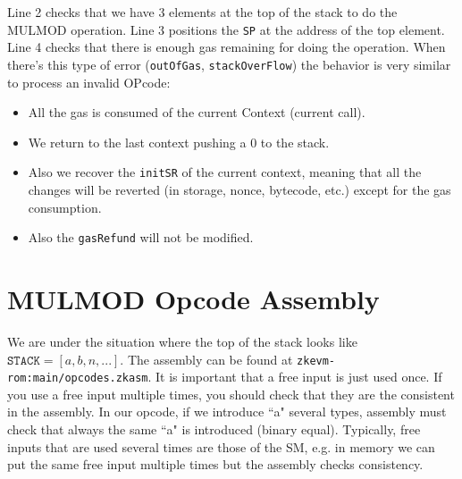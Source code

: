 

Line 2 checks that we have 3 elements at the top of the stack to do the MULMOD operation. Line 3 positions the \texttt{SP} at the address of the top element. Line 4 checks that there is enough gas remaining for doing the operation. When there's this type of error (\texttt{outOfGas}, \texttt{stackOverFlow}) the behavior is very similar to process an invalid OPcode: 

\begin{itemize}
    \item All the gas is consumed of the current Context (current call).
    \item We return to the last context pushing a 0 to the stack.
    \item Also we recover the \texttt{initSR} of the current context, meaning that all the changes will be reverted (in storage, nonce, bytecode, etc.) except for the gas consumption. 
    \item Also the \texttt{gasRefund} will not be modified.
\end{itemize}  



\section{MULMOD Opcode Assembly}

We are under the situation where the top of the stack looks like $ = [a, b, n, ... ]$. The assembly can be found at \texttt{zkevm-rom:main/opcodes.zkasm}. It is important that a free input is just used once. If you use a free input multiple times, you should check that they are the consistent in the assembly. In our opcode, if we introduce ``a" several types, assembly must check that always the same ``a" is introduced (binary equal). Typically, free inputs that are used several times are those of the SM, e.g. in memory we can put the same free input multiple times but the assembly checks consistency.

